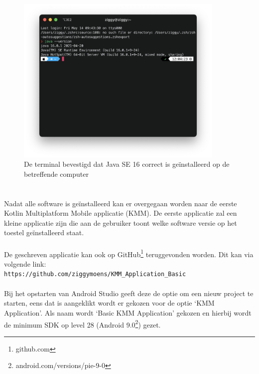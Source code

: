     \begin{figure}
        \centering
        \includegraphics[width=10cm]{img/jdk-version.png}
        \caption{De terminal bevestigd dat Java SE 16 correct is geïnstalleerd op de betreffende computer}
        \label{fig:M-jdk-version}
    \end{figure}

\section{}
\label{sec:M-first-app}
Nadat alle software is geïnstalleerd kan er overgegaan worden naar de eerste Kotlin Multiplatform Mobile applicatie (KMM). De eerste applicatie zal een kleine applicatie zijn die aan de gebruiker toont welke software versie op het toestel geïnstalleerd staat.
\\ \\
De geschreven applicatie kan ook op GitHub\footnote{github.com} teruggevonden worden. Dit kan via volgende link:\\
\verb*|https://github.com/ziggymoens/KMM_Application_Basic|
\\ \\
Bij het opstarten van Android Studio geeft deze de optie om een nieuw project te starten, eens dat is aangeklikt wordt er gekozen voor de optie `KMM Application'. Als naam wordt `Basic KMM Application' gekozen en hierbij wordt de minimum SDK op level 28 (Android 9.0\footnote{android.com/versions/pie-9-0}) gezet.

